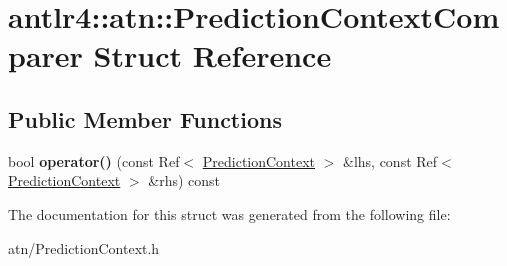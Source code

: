 \hypertarget{structantlr4_1_1atn_1_1PredictionContextComparer}{}\section{antlr4\+:\+:atn\+:\+:Prediction\+Context\+Comparer Struct Reference}
\label{structantlr4_1_1atn_1_1PredictionContextComparer}
\subsection*{Public Member Functions}
\begin{DoxyCompactItemize}
\item 
\mbox{\label{structantlr4_1_1atn_1_1PredictionContextComparer_a4302002a785e9f2accf37ac71fe31607}} 
bool {\bfseries operator()} (const Ref$<$ \hyperlink{classantlr4_1_1atn_1_1PredictionContext}{Prediction\+Context} $>$ \&lhs, const Ref$<$ \hyperlink{classantlr4_1_1atn_1_1PredictionContext}{Prediction\+Context} $>$ \&rhs) const
\end{DoxyCompactItemize}


The documentation for this struct was generated from the following file\+:\begin{DoxyCompactItemize}
\item 
atn/Prediction\+Context.\+h\end{DoxyCompactItemize}
